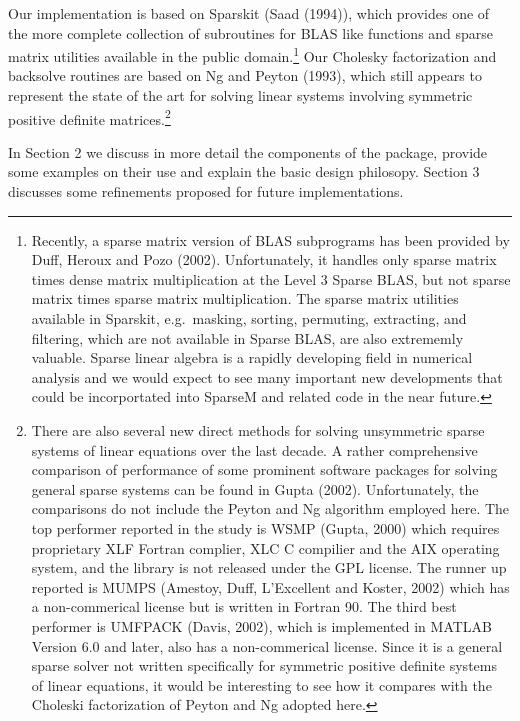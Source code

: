 \documentclass{article}
\begin{document}
Our implementation is based on Sparskit (Saad (1994)), which
provides one of the more complete collection of subroutines for BLAS like
functions and sparse matrix utilities available in the public domain.\footnote
{Recently, a sparse matrix version of BLAS subprograms has been
provided by Duff, Heroux and Pozo (2002). Unfortunately, it handles only
sparse matrix times dense matrix multiplication at the Level 3 Sparse BLAS,
but not sparse matrix times sparse matrix multiplication.
The sparse matrix utilities
available in Sparskit, e.g.\ masking, sorting, permuting, extracting, 
and filtering, which are not available in Sparse BLAS, are also extrememly valuable.
Sparse linear algebra is a rapidly developing field in numerical analysis and we
would expect to see many important new developments that could be incorportated into
SparseM and related code in the near future.}
Our Cholesky factorization and backsolve routines are based on Ng and Peyton
(1993), which still appears to represent the state of the art for solving linear
systems involving symmetric positive definite matrices.\footnote{There are also several new direct methods for
solving unsymmetric sparse systems of linear equations over the last decade. 
A rather comprehensive comparison of performance of some prominent
software packages for solving general sparse systems can be found in
Gupta (2002).  Unfortunately, the comparisons do not include the Peyton
and Ng algorithm employed here.
The top performer reported in the study is WSMP (Gupta, 2000)
which requires proprietary XLF Fortran complier, XLC C compilier
and the AIX operating system, and the library is not released under
the GPL license. The runner up reported
is MUMPS (Amestoy, Duff, L'Excellent and Koster, 2002) which has a 
non-commerical license but is written in Fortran 90. 
The third best performer is UMFPACK (Davis, 2002), 
which is implemented in MATLAB Version 6.0 and 
later, also has a non-commerical license. Since it is a general sparse solver
not written specifically for symmetric positive definite systems of linear
equations, it would be interesting to see how it compares with the 
Choleski factorization of Peyton and Ng adopted here.}


In Section 2 we discuss in more  detail the components of the package, provide some
examples on their use and explain the basic design philosopy. 
Section 3 discusses some refinements proposed for future implementations.
\end{document}
